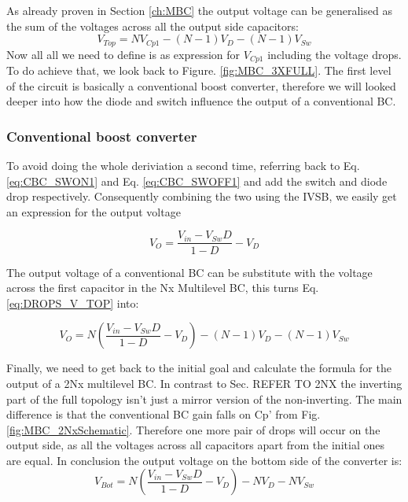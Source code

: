 As already proven in Section \ref{ch:MBC} the output voltage can be generalised as the sum of the voltages across all the output side capacitors: 
\begin{equation}
	V_{Top}= NV_{Cp1}-(N-1)V_D-(N-1)V_{Sw} 
	\label{eq:DROPS_V_TOP}
\end{equation}
Now all all we need to define is as expression for $V_{Cp1}$ including the voltage drops. To do achieve that, we look back to Figure. \ref{fig:MBC_3XFULL}. The first level of the circuit is basically a conventional boost converter, therefore we will looked deeper into how the diode and switch influence the output of a conventional BC. 

\subsubsection{Conventional boost converter}

To avoid doing the whole deriviation a second time, referring back to Eq. \ref{eq:CBC_SWON1} and Eq. \ref{eq:CBC_SWOFF1} and add the switch and diode drop respectively. Consequently combining the two using the IVSB, we easily get an expression for the output voltage \cite{BoostSwi93:online}

\begin{equation}
	V_{O}= \frac{V_{in}-V_{Sw}D}{1-D}-V_D
	\label{eq:DROPS_CONV}
\end{equation}

The output voltage of a conventional BC can be substitute with the voltage across the first capacitor in the Nx Multilevel BC, this turns Eq. \ref{eq:DROPS_V_TOP} into: 

\begin{equation}
	V_{O}= N( \frac{V_{in}-V_{Sw}D}{1-D}-V_D)-(N-1)V_D-(N-1)V_{Sw} 
	\label{eq:DROPS_NX_FINAL}
\end{equation}

Finally, we need to get back to the initial goal and calculate the formula for the output of a 2Nx multilevel BC. 
In contrast to Sec. REFER TO 2NX the inverting part of the full topology isn't just a mirror version of the non-inverting. The main difference is that the conventional BC gain falls on Cp' from Fig. \ref{fig:MBC_2NxSchematic}. Therefore one more pair of drops will occur on the output side, as all the voltages across all capacitors apart from the initial ones are equal. In conclusion the output voltage on the bottom side of the converter is:
\begin{equation}
	V_{Bot}= N(\frac{V_{in}-V_{Sw}D}{1-D}-V_D)-NV_D-NV_{Sw} 
	\label{eq:DROPS_V_BOT}
\end{equation}

